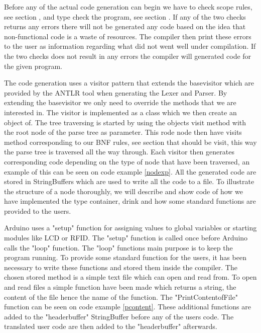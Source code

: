 Before any of the actual code generation can begin we have to check scope rules, see section , and type check the program, see section . If any of the two checks returns any errors there will not be generated any code based on the idea that non-functional code is a waste of resources. The compiler then print these errors to the user as information regarding what did not went well under compilation. If the two checks does not result in any errors the compiler will generated code for the given program.


The code generation uses a visitor pattern that extends the basevisitor which are provided by the ANTLR tool when generating the Lexer and Parser. By extending the basevisitor we only need to override the methods that we are interested in. The visitor is implemented as a class which we then create an object of. The tree traversing is started by using the objects visit method with the root node of the parse tree as parameter. This rode node then have visits method corresponding to our BNF rules, see section  that should be visit, this way the parse tree is traversed all the way through. Each visitor then generates corresponding code depending on the type of node that have been traversed, an example of this can be seen on code example \ref{nodexp}. All the generated code are stored in StringBuffers which are used to write all the code to a file. To illustrate the structure of a node thoroughly, we will describe and show code of how we have implemented the type container, drink and how some standard functions are provided to the users.


Arduino uses a "setup" function for assigning values to global variables or starting modules like LCD or RFID. The "setup" function is called once before Arduino calls the "loop" function. The "loop" functions main purpose is to keep the program running. To provide some standard function for the users, it has been necessary to write these functions and stored them inside the compiler. The chosen stored method is a simple text file which can open and read from. To open and read files a simple function have been made which returns a string, the content of the file hence the name of the function. The "PrintContentofFile" function can be seen on code example \ref{pcontent}. These additional functions are added to the "headerbuffer" StringBuffer before any of the users code. The translated user code are then added to the "headerbuffer" afterwards.

